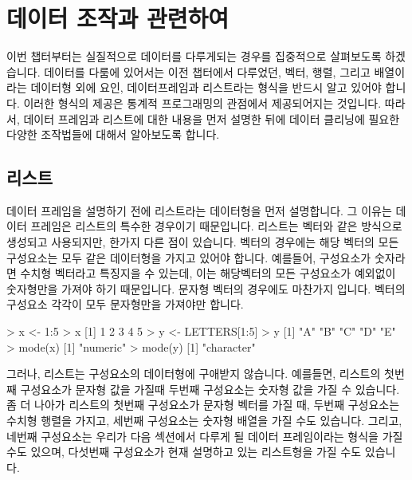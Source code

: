 	

%
%



\chapter{데이터 조작과 관련하여}

이번 챕터부터는 실질적으로 데이터를 다루게되는 경우를 집중적으로 살펴보도록 하겠습니다.
데이터를 다룸에 있어서는 이전 챕터에서 다루었던, 벡터, 행렬, 그리고 배열이라는 데이터형 외에 요인, 데이터프레임과 리스트라는 형식을 반드시 알고 있어야 합니다.
이러한 형식의 제공은 통계적 프로그래밍의 관점에서 제공되어지는 것입니다. 
따라서, 데이터 프레임과 리스트에 대한 내용을 먼저 설명한 뒤에 데이터 클리닝에 필요한 다양한 조작법들에 대해서 알아보도록 합니다.

\section{리스트}
데이터 프레임을 설명하기 전에 리스트라는 데이터형을 먼저 설명합니다.
그 이유는 데이터 프레임은 리스트의 특수한 경우이기 때문입니다.
리스트는 벡터와 같은 방식으로 생성되고 사용되지만, 한가지 다른 점이 있습니다.
벡터의 경우에는 해당 벡터의 모든 구성요소는 모두 같은 데이터형을 가지고 있어야 합니다.
예를들어, 구성요소가 숫자라면 수치형 벡터라고 특징지을 수 있는데, 이는 해당벡터의 모든 구성요소가 예외없이 숫자형만을 가져야 하기 때문입니다.
문자형 벡터의 경우에도 마찬가지 입니다. 
벡터의 구성요소 각각이 모두 문자형만을 가져야만 합니다.
\begin{Schunk}
\begin{Soutput}
> x <- 1:5
> x
[1] 1 2 3 4 5
> y <- LETTERS[1:5]
> y
[1] "A" "B" "C" "D" "E"
> mode(x)
[1] "numeric"
> mode(y)
[1] "character"
\end{Soutput}
\end{Schunk}

그러나, 리스트는 구성요소의 데이터형에 구애받지 않습니다.
예를들면, 리스트의 첫번째 구성요소가 문자형 값을 가질때 두번째 구성요소는 숫자형 값을 가질 수 있습니다.
좀 더 나아가 리스트의 첫번째 구성요소가 문자형 벡터를 가질 때, 두번째 구성요소는 수치형 행렬을 가지고, 세번째 구성요소는 숫자형 배열을 가질 수도 있습니다.
그리고, 네번째 구성요소는 우리가 다음 섹션에서 다루게 될 데이터 프레임이라는 형식을 가질 수도 있으며, 다섯번째 구성요소가 현재 설명하고 있는 리스트형을 가질 수도 있습니다.

